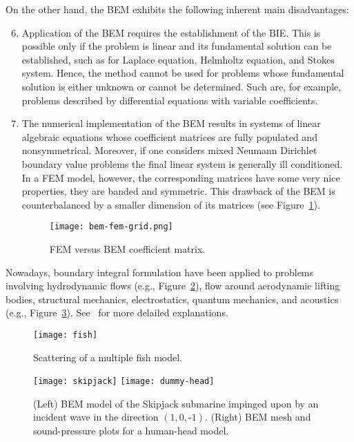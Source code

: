 On the other hand, the BEM exhibits the following inherent main disadvantages:
\begin{enumerate}
\setcounter{enumi}{5}
  \item Application of the BEM requires the establishment of the BIE. This is possible only if the problem is linear and its fundamental solution can be established, such as for Laplace equation, Helmholtz equation, and Stokes system. Hence, the method cannot be used for problems whose fundamental solution is either unknown or cannot be determined. Such are, for example, problems described by differential equations with variable coefficients.
  \item The numerical implementation of the BEM results in systems of linear algebraic equations whose coefficient matrices are fully populated and nonsymmetrical. Moreover, if one considers mixed Neumann Dirichlet boundary value problems the final linear system is generally ill conditioned. In a FEM model, however, the corresponding matrices have some very nice properties, they are banded and symmetric. This drawback of the BEM is counterbalanced by a smaller dimension of its matrices (see Figure~\ref{fig:bem-fem-grid}).
  \begin{figure}[H]
    \centering
    \texttt{[image: bem-fem-grid.png]}
    \caption{FEM versus BEM coefficient matrix.}
    \label{fig:bem-fem-grid}
  \end{figure}
\end{enumerate}

Nowadays, boundary integral formulation have been applied to problems involving hydrodynamic flows (e.g., Figure~\ref{fig:fish}), flow around aerodynamic lifting bodies, structural mechanics, electrostatics, quantum mechanics, and acoustics (e.g., Figure~\ref{fig:dummy-head}). See~\cite{Attilio} for more delailed explanations. 

\begin{figure}[H]
    \centering
    \texttt{[image: fish]}
    \caption{Scattering of a multiple fish model.} 
    \label{fig:fish}
\end{figure}

\begin{figure}[H]
    \centering
    \texttt{[image: skipjack]} 
    \qquad \qquad
    \texttt{[image: dummy-head]}
    \caption{(Left) BEM model of the Skipjack submarine impinged upon by an incident wave in the direction $(1, 0, \text{-}1)$. (Right) BEM mesh and sound-pressure plots for a human-head model.} 
    \label{fig:dummy-head}
\end{figure}

